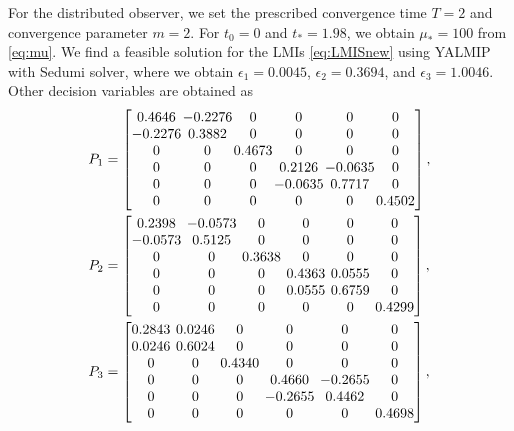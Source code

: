 \documentclass[journal]{IEEEtran}
\def\colsep{\setlength\arraycolsep}
\begin{document}
For the distributed observer, we set the prescribed convergence time $T=2$ and convergence parameter $m=2$. For $t_0=0$ and $t_\ast=1.98$, we obtain $\mu_{\ast} = 100$ from \eqref{eq:mu}. We find a feasible solution for the LMIs \eqref{eq:LMISnew} using {YALMIP with Sedumi solver}, where we obtain $\epsilon_1=0.0045$, $\epsilon_2=0.3694$, and $\epsilon_3=1.0046$. Other decision variables are obtained as 
\begin{align*}
    P_1 & = 
    \colsep{0.5pt}\begin{bmatrix}
    0.4646 &  -0.2276 &   0       &0         &0         &0\\
    -0.2276 &   0.3882 &   0       &0         &0         &0\\
    0      &   0      &   0.4673  &0         &0         &0\\
    0      &   0      &   0       &0.2126    &-0.0635    &0\\
    0      &   0      &   0       &-0.0635    &0.7717    &0\\
    0      &   0      &   0       &0         &0         &0.4502
    \end{bmatrix}, \\
    P_2 & =
      \colsep{2pt}\begin{bmatrix}
    0.2398   &-0.0573  & 0      &0      &0      &0\\
   -0.0573   & 0.5125  & 0      &0      &0      &0\\
    0        & 0       & 0.3638 &0      &0      &0\\
    0        & 0       & 0      &0.4363 &0.0555 &0\\
    0        & 0       & 0      &0.0555 &0.6759 &0\\
    0        & 0       & 0      &0      &0      &0.4299
      \end{bmatrix}, \\
    P_3 & = 
    \colsep{2pt}\begin{bmatrix}
    0.2843    &0.0246   & 0      &0        &0       &0\\
    0.0246    &0.6024   & 0      &0        &0       &0\\
    0         & 0       & 0.4340 &0        &0       &0\\
    0         & 0       & 0      &0.4660   &-0.2655 &0\\
    0         & 0       & 0      &-0.2655  &0.4462  &0\\
    0         & 0       & 0      &0        &0       &0.4698
    \end{bmatrix}, \\

\end{align*}
\end{document}
